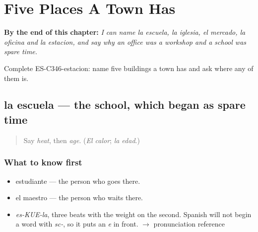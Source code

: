 
\chapter{Five Places A Town Has}
\label{ch:lugares-del-pueblo}

\begin{chapteropening}
\textbf{By the end of this chapter:} \emph{I can name la escuela, la iglesia, el mercado, la oficina and la estacion, and say why an office was a workshop and a school was spare time.}

Complete ES-C346-estacion: name five buildings a town has and ask where any of them is.
\end{chapteropening}

\section[la escuela]{la escuela — the school, which began as spare time}

\label{lesson:ES-C346-escuela}



\begin{quote}
Say \emph{heat}, then \emph{age}. (\emph{El calor}; \emph{la edad}.)
\end{quote}

\subsection*{What to know first}
\begin{itemize}
\raggedright
  \item estudiante — the person who goes there.
  \item el maestro — the person who waits there.
\end{itemize}

\begin{sounds}
\begin{itemize}
\raggedright
  \item \emph{es-KUE-la}, three beats with the weight on the second. Spanish will not begin a word with \emph{sc-}, so it puts an \emph{e} in front. $\to$ pronunciation reference
\end{itemize}
\end{sounds}

